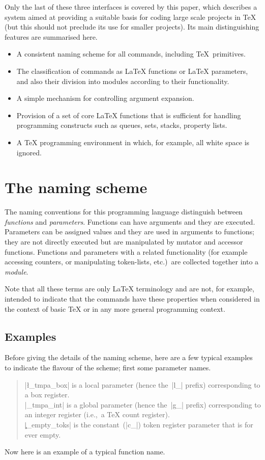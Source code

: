 \documentclass{article}
\providecommand \ie {i.e.,~}
\begin{document}
Only the last of these three interfaces is covered by this paper,
which describes a system aimed at providing a suitable basis for
coding large scale projects in \TeX{} (but this should not preclude its
use for smaller projects).  Its main distinguishing features are
summarised here.

\begin{itemize}
\item A consistent naming scheme for all commands, including \TeX\
  primitives.
\item The classification of commands as \LaTeX{} functions or \LaTeX{}
  parameters, and also their division into modules according to their
  functionality.
\item A simple mechanism for controlling argument expansion.
\item Provision of a set of core \LaTeX{} functions that is sufficient
  for handling programming constructs such as queues, sets,
  stacks, property lists.
\item A \TeX{} programming environment in which, for example, all
  white space is ignored.
\end{itemize}

\section{The naming scheme}
\label{sec:scheme}

The naming conventions for this programming language distinguish
between \textit{functions} and \textit{parameters}. Functions can have
arguments and they are executed.  Parameters can be assigned values
and they are used in arguments to functions; they are not directly
executed but are manipulated by mutator and accessor functions.
Functions and parameters with a related functionality (for example
accessing counters, or manipulating token-lists, etc.)\ are collected
together into a
\textit{module}.


Note that all these terms are only \LaTeX{} terminology and are not,
for example, intended to indicate that the commands have these
properties when considered in the context of basic \TeX{} or in any
more general programming context.


\subsection{Examples}
\label{sec:ex}

Before giving the details of the naming scheme, here are a few typical
examples to indicate the flavour of the scheme; first some parameter
names.
\begin{quote}
|\l_tmpa_box| is a local parameter (hence the~|l_| prefix)
corresponding to a box register.\\
|\g_tmpa_int| is a global parameter (hence the~|g_| prefix)
corresponding to an integer register (\ie a \TeX{} count register).\\
|\c_empty_toks|
is the constant~(|c_|) token register parameter that is for ever empty.
\end{quote}
Now here is an example of a typical function name.
\end{document}
